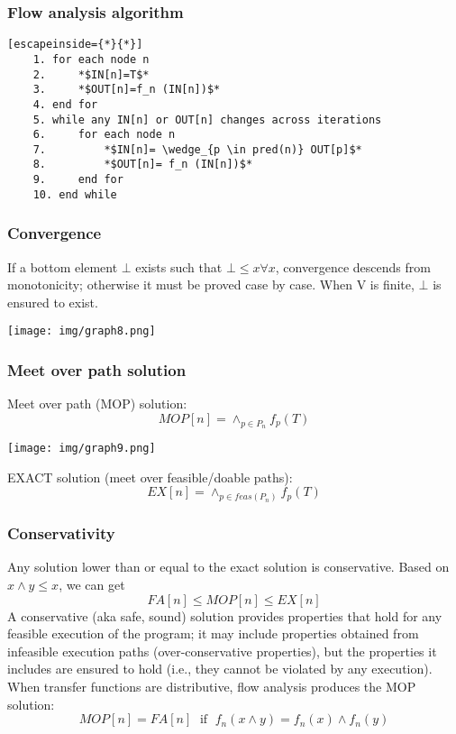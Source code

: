\documentclass[a4paper, 10pt, titlepage]{article}
\begin{document}
\subsubsection{Flow analysis algorithm}
\begin{lstlisting}[escapeinside={*}{*}]
	1. for each node n
	2. 	   *$IN[n]=T$*
	3.     *$OUT[n]=f_n (IN[n])$*
	4. end for
	5. while any IN[n] or OUT[n] changes across iterations
	6.     for each node n
	7.		   *$IN[n]= \wedge_{p \in pred(n)} OUT[p]$*
	8.         *$OUT[n]= f_n (IN[n])$*
	9.	   end for
	10. end while
\end{lstlisting}

\subsubsection{Convergence}
If a bottom element $\bot$ exists such that $\bot \leq x \forall x$, convergence
descends from monotonicity; otherwise it must be proved case
by case. When V is finite, $\bot$ is ensured to exist.
\begin{center}
\texttt{[image: img/graph8.png]}
\end{center}

\subsubsection{Meet over path solution}
Meet over path (MOP) solution:
$$MOP[n] = \wedge_{p \in P_n} f_p(T)$$
\begin{center}
\texttt{[image: img/graph9.png]}
\end{center}
EXACT solution (meet over feasible/doable paths):
$$EX[n]=\wedge_{p \in feas(P_n)} f_p(T)$$

\subsubsection{Conservativity}	%
Any solution lower than or equal to the exact solution is conservative. Based on $x \wedge y \leq x$, we can get
$$FA[n] \leq MOP[n] \leq EX[n]$$
A conservative (aka safe, sound) solution provides properties that hold for any feasible execution of the program; it may include properties obtained from infeasible execution paths (over-conservative properties), but the properties it includes are ensured to hold (i.e., they cannot be violated by any execution). When transfer functions are distributive, flow analysis produces the MOP solution:
$$MOP[n] = FA[n] \;\text{ if }\; f_n(x \wedge y) = f_n(x) \wedge f_n(y)$$
\end{document}
